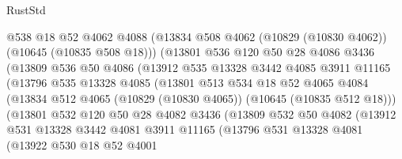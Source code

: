 \begin{lexlean}{RustStd}
\begin{coremodule}
                      @538
                      @18
                      @52
                      @4062
                      @4088
                      (@13834 @508 @4062 (@10829 (@10830 @4062)) (@10645 (@10835 @508 @18)))
                      (@13801
                        @536
                        @120
                        @50
                        @28
                        @4086
                        @3436
                        (@13809
                          @536
                          @50
                          @4086
                          (@13912
                            @535
                            @13328
                            @3442
                            @4085
                            @3911
                            @11165
                            (@13796
                              @535
                              @13328
                              @4085
                              (@13801
                                @513
                                @534
                                @18
                                @52
                                @4065
                                @4084
                                (@13834
                                  @512
                                  @4065
                                  (@10829 (@10830 @4065))
                                  (@10645 (@10835 @512 @18)))
                                (@13801
                                  @532
                                  @120
                                  @50
                                  @28
                                  @4082
                                  @3436
                                  (@13809
                                    @532
                                    @50
                                    @4082
                                    (@13912
                                      @531
                                      @13328
                                      @3442
                                      @4081
                                      @3911
                                      @11165
                                      (@13796
                                        @531
                                        @13328
                                        @4081
                                        (@13922
                                          @530
                                          @18
                                          @52
                                          @4001

\end{coremodule}
\end{lexlean}
